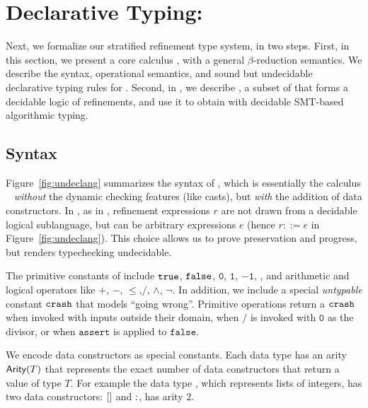 \section{Declarative Typing: \undeclang}\label{sec:language}\label{sec:undec}

Next, we formalize our stratified refinement type system, in two steps.
%
First, in this section, we present a core calculus \undeclang, 
with a general $\beta$-reduction semantics. We describe the syntax,
operational semantics, and sound but undecidable declarative typing 
rules for \undeclang. 
%
Second, in , we describe \logiclang, a subset 
of \undeclang that forms a decidable logic of refinements, and 
use it to obtain \declang with decidable SMT-based algorithmic typing.

\subsection{Syntax}\label{sec:undec:syntax} 



Figure~\ref{fig:undeclang} summarizes the syntax of \undeclang, 
which is essentially the calculus \hlang~\cite{Knowles10} 
\emph{without} the dynamic checking features (like casts), but 
\emph{with} the addition of data constructors.
%
In \undeclang, as in \hlang, refinement expressions $r$ are not drawn from a decidable 
logical sublanguage, but can be arbitrary expressions $e$
(hence $r ::= e$ in Figure~\ref{fig:undeclang}). 
This choice allows us to prove preservation and progress, 
but renders typechecking undecidable. 
 

The primitive constants of \undeclang include  
$\mathtt{true}$, $\mathtt{false}$, $\mathtt{0}$, $\mathtt{1}$, $\mathtt{-1}$, \etc,
and arithmetic and logical operators like $\mathtt{+}$, $\mathtt{-}$, 
$\mathtt{\leq}$,$\mathtt{/}$, $\mathtt{\land}$, $\mathtt{\lnot}$.
%
In addition, we include a special \emph{untypable} constant $\mathtt{crash}$ 
that models ``going wrong''. Primitive operations return a $\mathtt{crash}$
when invoked with inputs outside their domain, \eg when $\mathtt{/}$ 
is invoked with $\mathtt{0}$ as the divisor, or when $\mathtt{assert}$ is 
applied to $\mathtt{false}$.

We encode data constructors as special constants. 
Each data type has an arity $\mathsf{Arity}(T)$ that represents
the exact number of data constructors that return a value of 
type $T$.
%
For example the data type \tintlist, which represents 
lists of integers, has two data constructors: $\mathtt{[]}$ and $\mathtt{:}$,
\ie has arity $2$.


